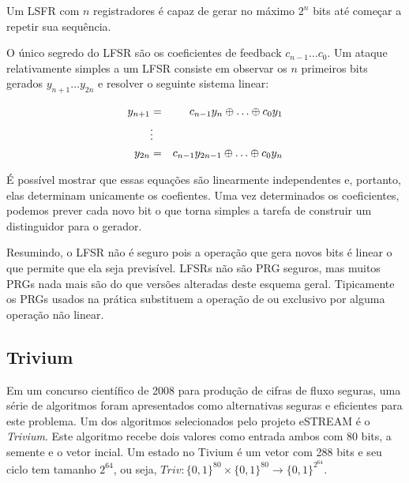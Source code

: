 Um LSFR com $n$ registradores é capaz de gerar no máximo $2^n$ bits até começar a repetir sua sequência.

O único segredo do LFSR são os coeficientes de feedback $c_{n-1} \dots c_0$.
Um ataque relativamente simples a um LFSR consiste em observar os $n$ primeiros bits gerados $y_{n+1} \dots y_{2n}$ e resolver o seguinte sistema linear:

\begin{eqnarray*}
  y_{n+1} &    =   & c_{n-1}y_n \xor \dots \xor c_0 y_1\\
         & \vdots &  \\
  y_{2n}  &    =   & c_{n-1}y_{2n-1} \xor \dots \xor c_0 y_n\\      
\end{eqnarray*}

É possível mostrar que essas equações são linearmente independentes e, portanto, elas determinam unicamente os coefientes.
Uma vez determinados os coeficientes, podemos prever cada novo bit o que torna simples a tarefa de construir um distinguidor para o gerador.

Resumindo, o LFSR não é seguro pois a operação que gera novos bits é linear o que permite que ela seja previsível.
LFSRs não são PRG seguros, mas muitos PRGs nada mais são do que versões alteradas deste esquema geral.
Tipicamente os PRGs usados na prática substituem a operação de ou exclusivo por alguma operação não linear.

\subsection{Trivium}
\label{sec:trivium}

Em um concurso científico de 2008 para produção de cifras de fluxo seguras, uma série de algoritmos foram apresentados como alternativas seguras e eficientes para este problema.
Um dos algoritmos selecionados pelo projeto eSTREAM é o {\em Trivium}.
Este algoritmo recebe dois valores como entrada ambos com 80 bits, a semente e o vetor incial.
Um estado no Tivium é um vetor com 288 bits e seu ciclo tem tamanho $2^{64}$, ou seja, $Triv: \{0,1\}^{80}\times \{0,1\}^{80} \to \{0,1\}^{2^{64}}$.


